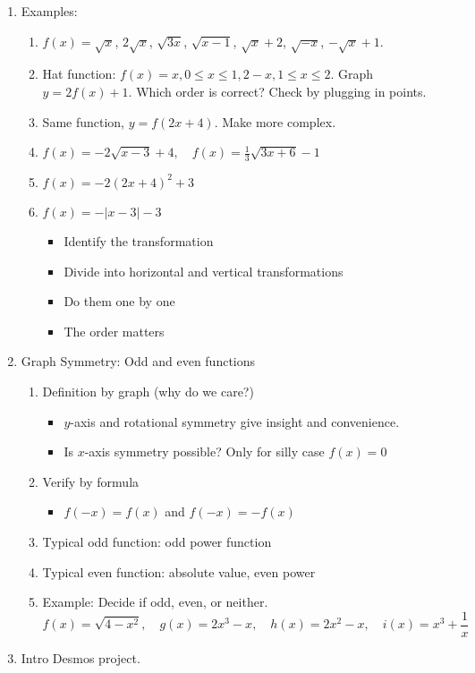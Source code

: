 \documentclass{article}
\begin{document}
\begin{enumerate}
\item Examples:
\begin{enumerate}
\item $f(x)=\sqrt{x}$, $2\sqrt{x}$, $\sqrt{3x}$, $\sqrt{x-1}$, $\sqrt{x}+2$, $\sqrt{-x}$, $-\sqrt{x}+1$.
\item Hat function: $f(x) = x, 0\leq x \leq 1, 2-x, 1\leq x \leq 2$. Graph $y=2f(x)+1$. Which order is correct? Check by plugging in points. 
\item Same function, $y=f(2x+4)$. Make more complex.
\item $f(x)=-2\sqrt{x-3}+4, \quad f(x)=\frac{1}{3}\sqrt{3x+6}-1$
\item $f(x)=-2(2x+4)^2+3$
\item $f(x)=-|x-3|-3$
\begin{itemize}
\item Identify the transformation
\item Divide into horizontal and vertical transformations
\item Do them one by one
\item The order matters
\end{itemize}
\end{enumerate}

\item Graph Symmetry: Odd and even functions
\begin{enumerate}
\item Definition by graph (why do we care?)
\begin{itemize}
\item $y$-axis and rotational symmetry give insight and convenience.
\item Is $x$-axis symmetry possible? Only for silly case $f(x)=0$
\end{itemize}
\item Verify by formula
\begin{itemize}
\item $f(-x)=f(x)$ and $f(-x)=-f(x)$
\end{itemize}
\item Typical odd function: odd power function
\item Typical even function: absolute value, even power 
\item Example: Decide if odd, even, or neither.
\[
f(x) = \sqrt{4-x^2}, \quad g(x) = 2x^3-x, \quad h(x) = 2x^2-x,  \quad i(x) = x^3 + \frac{1}{x}
\]
\end{enumerate}

\item Intro Desmos project.
\end{enumerate}
\end{document}
